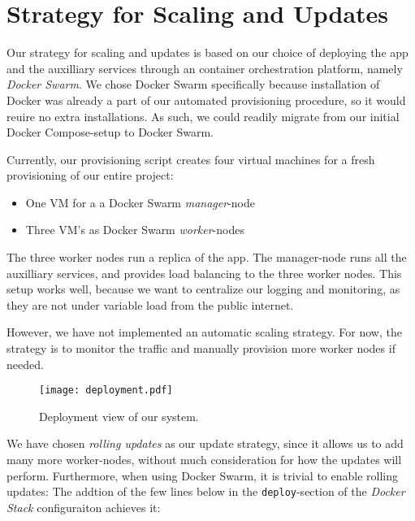 \section{Strategy for Scaling and Updates}\label{sec:scaling}

Our strategy for scaling and updates is based on our choice of deploying the app and the auxilliary services through an container orchestration platform, namely \textit{Docker Swarm}.
We chose Docker Swarm specifically because installation of Docker was already a part of our automated provisioning procedure, so it would reuire no extra installations.
As such, we could readily migrate from our initial Docker Compose-setup to Docker Swarm.

Currently, our provisioning script creates four virtual machines for a fresh provisioning of our entire project:

\begin{itemize}
	\item One VM for a a Docker Swarm \textit{manager}-node
	\item Three VM's as Docker Swarm \textit{worker}-nodes
\end{itemize}

The three worker nodes run a replica of the app.
The manager-node runs all the auxilliary services, and provides load balancing to the three worker nodes.
This setup works well, because we want to centralize our logging and monitoring, as they are not under variable load from the public internet.

However, we have not implemented an automatic scaling strategy. For now, the strategy is to monitor the traffic and manually provision more worker nodes if needed.

\begin{figure}
	\begin{center}
		\texttt{[image: deployment.pdf]}
	\end{center}
	\caption{Deployment view of our system.}\label{fig:deployment}
\end{figure}

We have chosen \textit{rolling updates} as our update strategy, since it allows us to add many more worker-nodes, without much consideration for how the updates will perform.
Furthermore, when using Docker Swarm, it is trivial to enable rolling updates: The addtion of the few lines below in the \texttt{deploy}-section of the \textit{Docker Stack} configuraiton achieves it:

